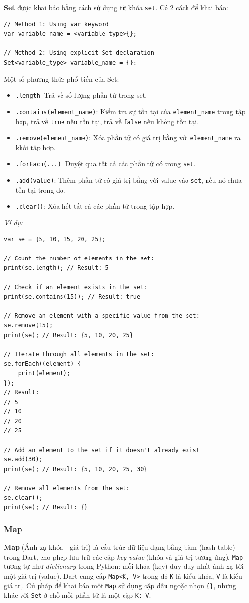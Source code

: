 \documentclass[../DoAn.tex]{subfiles}
\numberwithin{figure}{chapter}
\begin{document}
\textbf{Set} được khai báo bằng cách sử dụng từ khóa \texttt{set}. Có 2 cách để khai báo:
\begin{lstlisting}
// Method 1: Using var keyword
var variable_name = <variable_type>{};

// Method 2: Using explicit Set declaration
Set<variable_type> variable_name = {};
\end{lstlisting}

Một số phương thức phổ biến của Set: 
\begin{itemize}
\item \texttt{.length}: Trả về số lượng phần tử trong set.
\item \texttt{.contains(element\_name)}: Kiểm tra sự tồn tại của \texttt{element\_name} trong tập hợp, trả về \texttt{true} nếu tồn tại, trả về \texttt{false} nếu không tồn tại.
\item \texttt{.remove(element\_name)}: Xóa phần tử có giá trị bằng với \texttt{element\_name} ra khỏi tập hợp.
\item \texttt{.forEach(...)}: Duyệt qua tất cả các phần tử có trong \texttt{set}.
\item \texttt{.add(value)}: Thêm phần tử có giá trị bằng với value vào \texttt{set}, nếu nó chưa tồn tại trong đó.
\item \texttt{.clear()}: Xóa hết tất cả các phần tử trong tập hợp.
\end{itemize}

\textit{Ví dụ:}
\begin{lstlisting}
var se = {5, 10, 15, 20, 25};

// Count the number of elements in the set:
print(se.length); // Result: 5

// Check if an element exists in the set:
print(se.contains(15)); // Result: true

// Remove an element with a specific value from the set:
se.remove(15);
print(se); // Result: {5, 10, 20, 25}

// Iterate through all elements in the set:
se.forEach((element) {
    print(element);
});
// Result:
// 5
// 10
// 20
// 25

// Add an element to the set if it doesn't already exist
se.add(30);
print(se); // Result: {5, 10, 20, 25, 30}

// Remove all elements from the set:
se.clear();
print(se); // Result: {}
\end{lstlisting}

\subsubsection{Map} 
\textbf{Map} (Ánh xạ khóa - giá trị) là cấu trúc dữ liệu dạng bẳng băm (hash table) trong Dart, cho phép lưu trữ các cặp \textit{key-value} (khóa và giá trị tương ứng). \texttt{Map} tương tự như \textit{dictionary} trong Python: mỗi khóa (key) duy  duy nhất ánh xạ tới một giá trị (value).
Dart cung cấp \texttt{Map<K, V>} trong đó \texttt{K} là kiểu khóa, \texttt{V} là kiểu giá trị.  Cú pháp để khai báo một \texttt{Map} sử dụng cặp dấu ngoặc nhọn \texttt{\{\}}, nhưng khác với \texttt{Set} ở chỗ mỗi phần tử là một cặp \texttt{K: V}. 
\end{document}
